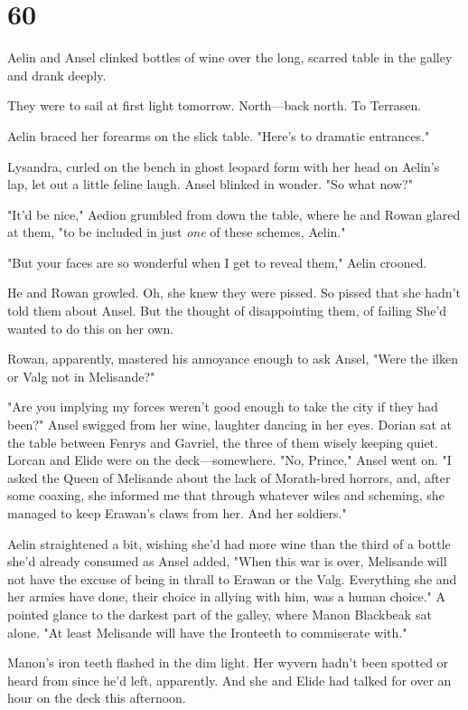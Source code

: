 
\chapter{60}

Aelin and Ansel clinked bottles of wine over the long, scarred table in the galley and drank deeply.

They were to sail at first light tomorrow. North---back north. To Terrasen.

Aelin braced her forearms on the slick table. "Here's to dramatic entrances."

Lysandra, curled on the bench in ghost leopard form with her head on Aelin's lap, let out a little feline laugh. Ansel blinked in wonder. "So what now?"

"It'd be nice," Aedion grumbled from down the table, where he and Rowan glared at them, "to be included in just \emph{one} of these schemes, Aelin."

"But your faces are so wonderful when I get to reveal them," Aelin crooned.

He and Rowan growled. Oh, she knew they were pissed. So pissed that she hadn't told them about Ansel. But the thought of disappointing them, of failing  She'd wanted to do this on her own.

Rowan, apparently, mastered his annoyance enough to ask Ansel, "Were the ilken or Valg not in Melisande?"

"Are you implying my forces weren't good enough to take the city if they had been?" Ansel swigged from her wine, laughter dancing in her eyes. Dorian sat at the table between Fenrys and Gavriel, the three of them wisely keeping quiet. Lorcan and Elide were on the deck---somewhere. "No, Prince," Ansel went on. "I asked the Queen of Melisande about the lack of Morath-bred horrors, and, after some coaxing, she informed me that through whatever wiles and scheming, she managed to keep Erawan's claws from her. And her soldiers."

Aelin straightened a bit, wishing she'd had more wine than the third of a bottle she'd already consumed as Ansel added, "When this war is over, Melisande will not have the excuse of being in thrall to Erawan or the Valg. Everything she and her armies have done, their choice in allying with him, was a human choice." A pointed glance to the darkest part of the galley, where Manon Blackbeak sat alone. "At least Melisande will have the Ironteeth to commiserate with."

Manon's iron teeth flashed in the dim light. Her wyvern hadn't been spotted or heard from since he'd left, apparently. And she and Elide had talked for over an hour on the deck this afternoon.

